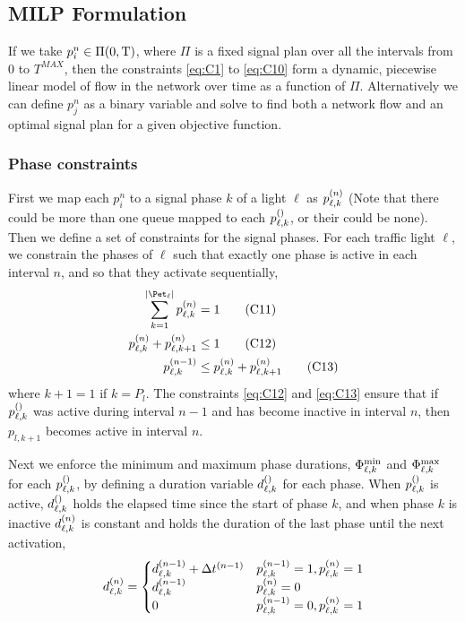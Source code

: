 \subsection{MILP Formulation}
If we take $p_i^n \in \Pi(0,\TMAX)$, where $\Pi$ is a fixed signal plan over all the intervals from 0 to $T^{MAX}$, then the constraints \ref{eq:C1} to \ref{eq:C10} form a dynamic, piecewise linear model of flow in the network over time as a function of $\Pi$. Alternatively we can define $p_j^n$ as a binary variable and solve to find both a network flow and an optimal signal plan for a given objective function.

\subsubsection{Phase constraints}
First we map each $p_i^n$ to a signal phase $k$ of a light $\ell$ as $\p{\ell}{k}$ (Note that there could be more than one queue mapped to each $\p[]{\ell}{k}$, or their could be none). Then we define a set of constraints for the signal phases. For each traffic light $\ell$, we constrain the phases of $\ell$ such that exactly one phase is active in each interval $n$, and so that they activate sequentially,
\begin{align}
\sum\limits_{k=1}^{\Pn} \p{\ell}{k} &= 1\tag{C11}\label{eq:C11}\\
\p{\ell}{k} + \p{\ell}{k+1} &\le 1\tag{C12}\label{eq:C12}\\
\p[n-1]{\ell}{k} &\le \p{\ell}{k} + \p{\ell}{k+1}\tag{C13}\label{eq:C13}
\end{align}
where $k+1=1$ if $k=P_l$. The constraints \ref{eq:C12} and \ref{eq:C13} ensure that if $\p[]{\ell}{k}$ was active during interval $n-1$ and has become inactive in interval $n$, then $p_{l,k+1}$ becomes active in interval $n$.

Next we enforce the minimum and maximum phase durations, $\PTMIN{\ell}{k}$ and $\PTMAX{\ell}{k}$ for each $\p[]{\ell}{k}$, by defining a duration variable $\pd[]{\ell}{k}$ for each phase. When $\p[]{\ell}{k}$ is active, $\pd[]{\ell}{k}$ holds the elapsed time since the start of phase $k$, and when phase $k$ is inactive $\pd{\ell}{k}$ is constant and holds the duration of the last phase until the next activation,
\begin{equation}
\pd{\ell}{k} = 
\begin{cases}
\pd[n-1]{\ell}{k} + \DT[n-1] & \p[n-1]{\ell}{k}=1,\p{\ell}{k}=1\\
\pd[n-1]{\ell}{k} & \p{\ell}{k}=0\\
0 & \p[n-1]{\ell}{k}=0,\p{\ell}{k}=1
\end{cases}
\end{equation}


